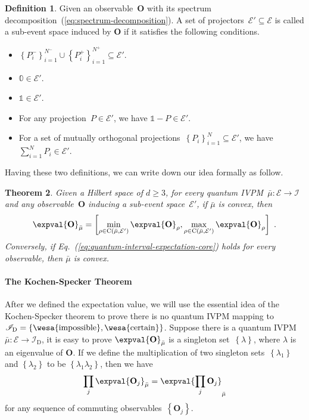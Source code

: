 \documentclass[english,reprint, aps, prl,superscriptaddress, showpacs,
showkeys, longbibliography, amsmath, amssymb]{revtex4-1}
\theoremstyle{plain}
\newtheorem{thm}{Theorem}
\theoremstyle{definition}
\newtheorem{definition}[thm]{Definition}
\newcommand{\events}{\ensuremath{\mathcal{E}}}
\newcommand{\imposs}{{\text{\wesa{impossible}}}}
\newcommand{\necess}{{\text{\wesa{certain}}}}
\newcommand{\coreBorn}{\ensuremath{\mathrm{C}}}
\begin{document}
\begin{definition}Given an observable~$\mathbf{O}$ with its spectrum
decomposition~(\ref{eq:spectrum-decomposition}). A set of projectors~$\events'\subseteq\events$
is called a sub-event space induced by $\mathbf{O}$ if it satisfies
the following conditions.
\begin{itemize}
\item $\left\{ P_{i}^{-}\right\} _{i=1}^{N^{-}}\cup\left\{ P_{i}^{+}\right\} _{i=1}^{N^{+}}\subseteq\events'$.
\item $\mathbb{0}\in\events'$. 
\item $\mathbb{1}\in\events'$. 
\item For any projection~$P\in\events'$, we have $\mathbb{1}-P\in\events'$. 
\item For a set of mutually orthogonal projections~$\left\{ P_{i}\right\} _{i=1}^{N}\subseteq\events'$,
we have $\sum_{i=1}^{N}P_{i}\in\events'$. 
\end{itemize}
\end{definition}

\noindent Having these two definitions, we can write down our idea
formally as follow.

\begin{thm}Given a Hilbert space of $d\ge3$, for every quantum IVPM~$\bar{\mu}:\events\rightarrow\mathscr{I}$
and any observable~$\mathbf{O}$ inducing a sub-event space~$\events'$,
if $\bar{\mu}$ is convex, then
\begin{equation}
\expval{\mathbf{O}}_{\bar{\mu}}=\left[\min_{\rho\in\coreBorn\left(\bar{\mu},\events'\right)}\expval{\mathbf{O}}_{\rho},\max_{\rho\in\coreBorn\left(\bar{\mu},\events'\right)}\expval{\mathbf{O}}_{\rho}\right]\textrm{ .}\label{eq:quantum-interval-expectation-core}
\end{equation}
Conversely, if Eq.~(\ref{eq:quantum-interval-expectation-core})
holds for every observable, then $\bar{\mu}$ is convex.\end{thm}

\paragraph{The Kochen-Specker Theorem}

After we defined the expectation value, we will use the essential
idea of the Kochen-Specker theorem to prove there is no quantum IVPM
mapping to $\mathscr{I}_{\mathrm{D}}=\left\{ \imposs,\necess\right\} $.
Suppose there is a quantum IVPM~$\bar{\mu}:\events\rightarrow\mathscr{I}_{\mathrm{D}}$,
it is easy to prove $\expval{\mathbf{O}}_{\bar{\mu}}$ is a singleton
set~$\left\{ \lambda\right\} $, where $\lambda$ is an eigenvalue
of $\mathbf{O}$. If we define the multiplication of two singleton
sets~$\left\{ \lambda_{1}\right\} $ and $\left\{ \lambda_{2}\right\} $
to be $\left\{ \lambda_{1}\lambda_{2}\right\} $, then we have 
\begin{equation}
\prod_{j}\expval{\mathbf{O}_{j}}_{\bar{\mu}}=\expval{\prod_{j}\mathbf{O}_{j}}_{\bar{\mu}}\label{eq:Kochen-Specker-Rules}
\end{equation}
for any sequence of commuting observables~$\left\{ \mathbf{O}_{j}\right\} $.
\end{document}
